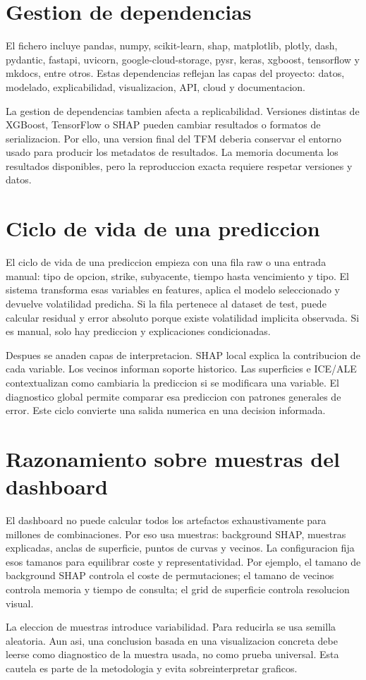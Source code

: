 \section{Gestion de dependencias}

El fichero  incluye pandas, numpy, scikit-learn, shap, matplotlib, plotly, dash, pydantic, fastapi, uvicorn, google-cloud-storage, pysr, keras, xgboost, tensorflow y mkdocs, entre otros. Estas dependencias reflejan las capas del proyecto: datos, modelado, explicabilidad, visualizacion, API, cloud y documentacion.

La gestion de dependencias tambien afecta a replicabilidad. Versiones distintas de XGBoost, TensorFlow o SHAP pueden cambiar resultados o formatos de serializacion. Por ello, una version final del TFM deberia conservar el entorno usado para producir los metadatos de resultados. La memoria documenta los resultados disponibles, pero la reproduccion exacta requiere respetar versiones y datos.

\section{Ciclo de vida de una prediccion}

El ciclo de vida de una prediccion empieza con una fila raw o una entrada manual: tipo de opcion, strike, subyacente, tiempo hasta vencimiento y tipo. El sistema transforma esas variables en features, aplica el modelo seleccionado y devuelve volatilidad predicha. Si la fila pertenece al dataset de test, puede calcular residual y error absoluto porque existe volatilidad implicita observada. Si es manual, solo hay prediccion y explicaciones condicionadas.

Despues se anaden capas de interpretacion. SHAP local explica la contribucion de cada variable. Los vecinos informan soporte historico. Las superficies e ICE/ALE contextualizan como cambiaria la prediccion si se modificara una variable. El diagnostico global permite comparar esa prediccion con patrones generales de error. Este ciclo convierte una salida numerica en una decision informada.

\section{Razonamiento sobre muestras del dashboard}

El dashboard no puede calcular todos los artefactos exhaustivamente para millones de combinaciones. Por eso usa muestras: background SHAP, muestras explicadas, anclas de superficie, puntos de curvas y vecinos. La configuracion fija esos tamanos para equilibrar coste y representatividad. Por ejemplo, el tamano de background SHAP controla el coste de permutaciones; el tamano de vecinos controla memoria y tiempo de consulta; el grid de superficie controla resolucion visual.

La eleccion de muestras introduce variabilidad. Para reducirla se usa semilla aleatoria. Aun asi, una conclusion basada en una visualizacion concreta debe leerse como diagnostico de la muestra usada, no como prueba universal. Esta cautela es parte de la metodologia y evita sobreinterpretar graficos.
